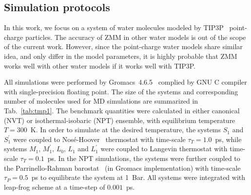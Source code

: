 \documentclass[a4paper,preprint,unsortedaddress,onecolumn,fleqn]{revtex4}
\begin{document}
\subsection{Simulation protocols}

\label{sec:protocols} In this work, we focus on a system of water molecules
modeled by TIP3P~\cite{jorgensen1983comparison} point-charge particles. 
The accuracy of ZMM in other water models is out of the scope of the current
work. However, since the point-charge water models share similar idea, and
only differ in the model parameters, it is highly probable that ZMM works
well with other water models if it works well with TIP3P.

All simulations were performed by Gromacs~4.6.5~\cite{hess2008gromacs,
pronk2013gromacs} complied by GNU C compiler with single-precision floating
point. The size of the systems and corresponding number of molecules used
for MD simulations are summarized in Tab.~\ref{tab:tmp1}. The benchmark
quantities were calculated in either canonical (NVT) or isothermal-isobaric
(NPT) ensemble, with equilibrium temperature $T=300$~K. In order to simulate
at the desired temperature, the systems $S_{1}$ and $S_{1}^{\prime }$ were
coupled to Nos\'{e}-Hoover~\cite{nose1984molecular,hoover1985canonical}
thermostat with time-scale $\tau _{T}=1.0$~ps, while systems $M_{1}$, $%
M_{1}^{\prime }$, $L_{0}$, $L_{1}$ and $L_{1}^{\prime }$ were coupled to
Langevin thermostat with time-scale $\tau _{T}=0.1$~ps. In the NPT
simulations, the systems were further coupled to the Parrinello-Rahman
barostat~\cite{parrinello1980crystal,parrinello1981polymorphic} (in Gromacs
implementation) with time-scale $\tau _{P}=0.5$~ps to equilibrate the system
at 1~Bar. All systems were integrated with leap-frog scheme at a time-step
of $0.001$~ps.

\end{document}
